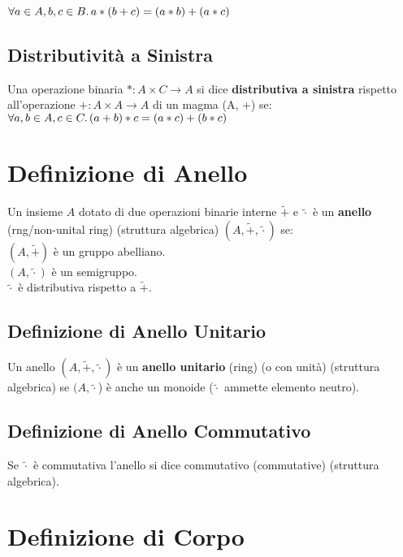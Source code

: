 \documentclass[a4paper, twoside, italian, 11pt]{book}
\begin{document}
$\forall a \in A, b, c \in B \ldotp a * (b + c) = (a * b) + (a * c)$


\subsection{Distributività a Sinistra}

Una operazione binaria $* : A \times C \rightarrow A$ si dice \textbf{distributiva a sinistra} rispetto all'operazione $+ : A \times A \rightarrow A$ di un magma (A, +) se: \\

$\forall a, b \in A, c \in C \ldotp (a + b) * c = (a * c) + (b * c)$



\section{Definizione di Anello}

Un insieme $A$ dotato di due operazioni binarie interne $\tilde +$ e $\tilde\cdot$ è un \textbf{anello} (rng/non-unital ring) (struttura algebrica) $(A, \tilde +, \tilde\cdot)$ se: \\

$(A, \tilde +)$ è un gruppo abelliano. \\
\indent
$(A, \tilde\cdot)$ è un semigruppo. \\
\indent
$\tilde\cdot$ è distributiva rispetto a $\tilde +$.


\subsection{Definizione di Anello Unitario}

Un anello $(A, \tilde +, \tilde\cdot)$ è un \textbf{anello unitario} (ring) (o con unità) (struttura algebrica) se $(A, \tilde\cdot$) è anche un monoide ($\tilde\cdot$ ammette elemento neutro).


\subsection{Definizione di Anello Commutativo}

Se $\tilde\cdot$ è commutativa l'anello si dice commutativo (commutative) (struttura algebrica).



\section{Definizione di Corpo}
\end{document}
